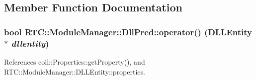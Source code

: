 \subsection{Member Function Documentation}
\subsubsection[{operator()}]{\setlength{\rightskip}{0pt plus 5cm}bool RTC::ModuleManager::DllPred::operator() ({\bf DLLEntity} $\ast$ {\em dllentity})\hspace{0.3cm}{\ttfamily  [inline]}}\label{classRTC_1_1ModuleManager_1_1DllPred_a8f4c3819da12b3a7b4ea1c6c566c4c92}


References coil::Properties::getProperty(), and RTC::ModuleManager::DLLEntity::properties.

